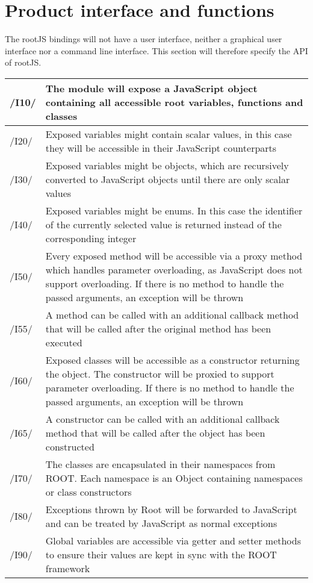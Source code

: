 \chapter{Product interface and functions}
The rootJS bindings will not have a user interface, neither a graphical user interface nor a command line interface.
This section will therefore specify the API of rootJS.


\begin{longtable}{|p{1cm} | p{15cm}|}
   \hline
  /I10/ & The module will expose a JavaScript object containing all accessible root variables, functions and classes \\
  \hline
  /I20/ & Exposed variables might contain scalar values, in this case they will be accessible in their JavaScript counterparts \\
  \hline
  /I30/ & Exposed variables might be objects, which are recursively converted to JavaScript objects until there are only scalar values \\
  \hline
  /I40/ & Exposed variables might be enums. In this case the identifier of the currently selected value is returned instead of the corresponding integer \\
  \hline
  /I50/ & Every exposed method will be accessible via a proxy method which handles parameter overloading, as JavaScript does not support overloading. If there is no method to handle the passed arguments, an exception will be thrown \\
  \hline
  /I55/ & A method can be called with an additional callback method that will be called after the original method has been executed \\
  \hline
  /I60/ & Exposed classes will be accessible as a constructor returning the object. The constructor will be proxied to support parameter overloading. If there is no method to handle the passed arguments, an exception will be thrown  \\
  \hline
  /I65/ & A constructor can be called with an additional callback method that will be called after the object has been constructed \\
  \hline
  /I70/ & The classes are encapsulated in their namespaces from ROOT. Each namespace is an Object containing namespaces or class constructors \\
  \hline
  /I80/ & Exceptions thrown by Root will be forwarded to JavaScript and can be treated by JavaScript as normal exceptions \\
  \hline
  /I90/ & Global variables are accessible via getter and setter methods to ensure their values are kept in sync with the ROOT framework \\
   \hline
\end{longtable}
